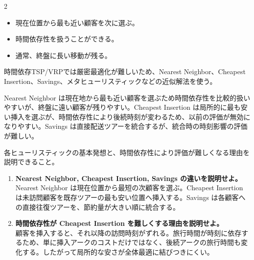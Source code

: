 \begin{multicols}{2}

\footnotesize

\raggedcolumns


\begin{itemize}
\item 現在位置から最も近い顧客を次に選ぶ。
\item 時間依存性を扱うことができる。
\item 通常、終盤に長い移動が残る。
\end{itemize}

時間依存TSP/VRPでは厳密最適化が難しいため、Nearest Neighbor、Cheapest Insertion、Savings、メタヒューリスティックなどの近似解法を使う。\par

Nearest Neighbor は現在地から最も近い顧客を選ぶため時間依存性を比較的扱いやすいが、終盤に遠い顧客が残りやすい。Cheapest Insertion は局所的に最も安い挿入を選ぶが、時間依存性により後続時刻が変わるため、以前の評価が無効になりやすい。Savings は直接配送ツアーを統合するが、統合時の時刻影響の評価が難しい。\par

各ヒューリスティックの基本発想と、時間依存性により評価が難しくなる理由を説明できること。\par


\begin{enumerate}
\item \textbf{Nearest Neighbor, Cheapest Insertion, Savings の違いを説明せよ。}\\
Nearest Neighbor は現在位置から最短の次顧客を選ぶ。Cheapest Insertion は未訪問顧客を既存ツアーの最も安い位置へ挿入する。Savings は各顧客への直接往復ツアーを、節約量が大きい順に統合する。
\item \textbf{時間依存性が Cheapest Insertion を難しくする理由を説明せよ。}\\
顧客を挿入すると、それ以降の訪問時刻がずれる。旅行時間が時刻に依存するため、単に挿入アークのコストだけではなく、後続アークの旅行時間も変化する。したがって局所的な安さが全体最適に結びつきにくい。
\end{enumerate}

\end{multicols}

